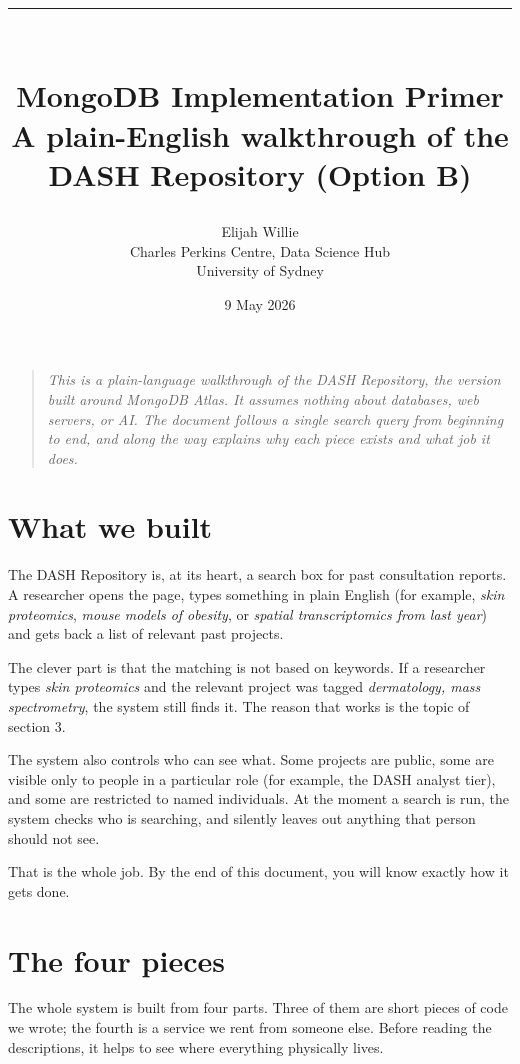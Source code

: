 \documentclass[11pt,a4paper]{article}
\title{\vspace{-2cm}\textcolor{usydred}{\rule{\textwidth}{4pt}}\\[1em]
\Huge\bfseries MongoDB Implementation Primer\\[0.4em]
\large\mdseries\color{mutedtext} A plain-English walkthrough of the DASH Repository (Option B)}
\author{Elijah Willie \\ \small Charles Perkins Centre, Data Science Hub \\ \small University of Sydney}
\date{9 May 2026}
\begin{document}
\maketitle
\thispagestyle{empty}
\vspace{1em}

\begin{quote}
\itshape\color{mutedtext}\small
This is a plain-language walkthrough of the DASH Repository, the version built around MongoDB Atlas. It assumes nothing about databases, web servers, or AI. The document follows a single search query from beginning to end, and along the way explains why each piece exists and what job it does.
\end{quote}

\vspace{1em}

\section{What we built}

The DASH Repository is, at its heart, a search box for past consultation reports. A researcher opens the page, types something in plain English (for example, \emph{skin proteomics}, \emph{mouse models of obesity}, or \emph{spatial transcriptomics from last year}) and gets back a list of relevant past projects.

The clever part is that the matching is not based on keywords. If a researcher types \emph{skin proteomics} and the relevant project was tagged \emph{dermatology, mass spectrometry}, the system still finds it. The reason that works is the topic of section 3.

The system also controls who can see what. Some projects are public, some are visible only to people in a particular role (for example, the DASH analyst tier), and some are restricted to named individuals. At the moment a search is run, the system checks who is searching, and silently leaves out anything that person should not see.

That is the whole job. By the end of this document, you will know exactly how it gets done.

\section{The four pieces}

The whole system is built from four parts. Three of them are short pieces of code we wrote; the fourth is a service we rent from someone else. Before reading the descriptions, it helps to see where everything physically lives.
\end{document}
